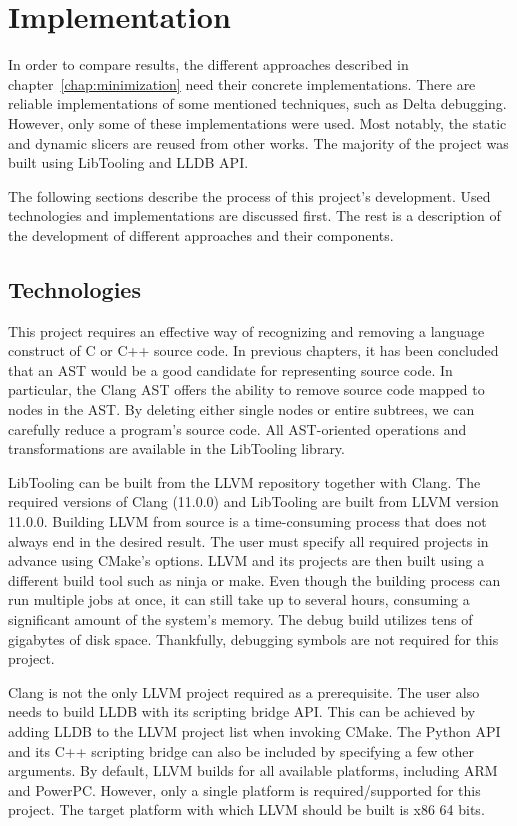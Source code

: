 \chapter{Implementation}

In order to compare results, the different approaches described in 
chapter~\ref{chap:minimization} need their concrete implementations.
There are reliable implementations of some mentioned techniques, such as 
Delta debugging.
However, only some of these implementations were used.
Most notably, the static and dynamic slicers are reused from other works.
The majority of the project was built using LibTooling and LLDB API.

The following sections describe the process of this project's development.
Used technologies and implementations are discussed first.
The rest is a description of the development of different approaches and 
their components.

\section{Technologies}

This project requires an effective way of recognizing and removing a language 
construct of C or C++ source code.
In previous chapters, it has been concluded that an AST would be a good 
candidate for representing source code.
In particular, the Clang AST offers the ability to remove source code mapped 
to nodes in the AST.
By deleting either single nodes or entire subtrees, we can carefully reduce 
a program's source code.
All AST-oriented operations and transformations are available in 
the LibTooling library.

LibTooling can be built from the LLVM repository together with Clang.
The required versions of Clang (11.0.0) and LibTooling are built from LLVM 
version 11.0.0.
Building LLVM from source is a time-consuming process that does not always 
end in the desired result.
The user must specify all required projects in advance using CMake's options.
LLVM and its projects are then built using a different build tool such as 
ninja or make.
Even though the building process can run multiple jobs at once, it can still 
take up to several hours, consuming a significant amount of the system's 
memory.
The debug build utilizes tens of gigabytes of disk space.
Thankfully, debugging symbols are not required for this project.

Clang is not the only LLVM project required as a prerequisite.
The user also needs to build LLDB with its scripting bridge API.
This can be achieved by adding LLDB to the LLVM project list when invoking 
CMake.
The Python API and its C++ scripting bridge can also be included by 
specifying a few other arguments.
By default, LLVM builds for all available platforms, including ARM and 
PowerPC.
However, only a single platform is required/supported for this project.
The target platform with which LLVM should be built is x86 64 bits.

